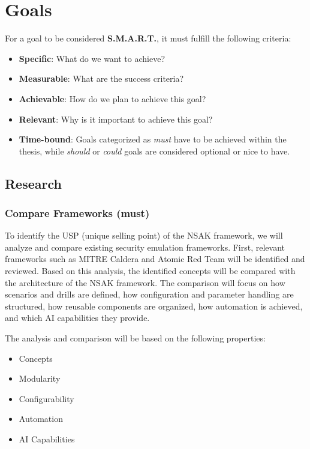 \section{Goals}

For a goal to be considered \textbf{S.M.A.R.T.}, it must fulfill the following criteria:

\begin{itemize}
	\item \textbf{Specific}: What do we want to achieve?
	\item \textbf{Measurable}: What are the success criteria?
	\item \textbf{Achievable}: How do we plan to achieve this goal?
	\item \textbf{Relevant}: Why is it important to achieve this goal?
	\item \textbf{Time-bound}: Goals categorized as \textit{must} have to be achieved within the thesis, while \textit{should} or \textit{could} goals are considered optional or nice to have.
\end{itemize}

\subsection{Research}

\subsubsection{Compare Frameworks (must)}

To identify the USP (unique selling point) of the NSAK framework, we will analyze and compare existing security emulation frameworks. First, relevant frameworks such as MITRE Caldera and Atomic Red Team will be identified and reviewed. Based on this analysis, the identified concepts will be compared with the architecture of the NSAK framework. The comparison will focus on how scenarios and drills are defined, how configuration and parameter handling are structured, how reusable components are organized, how automation is achieved, and which AI capabilities they provide.

The analysis and comparison will be based on the following properties:

\begin{itemize}
	\item Concepts
	\item Modularity
	\item Configurability
	\item Automation
	\item AI Capabilities
\end{itemize}


